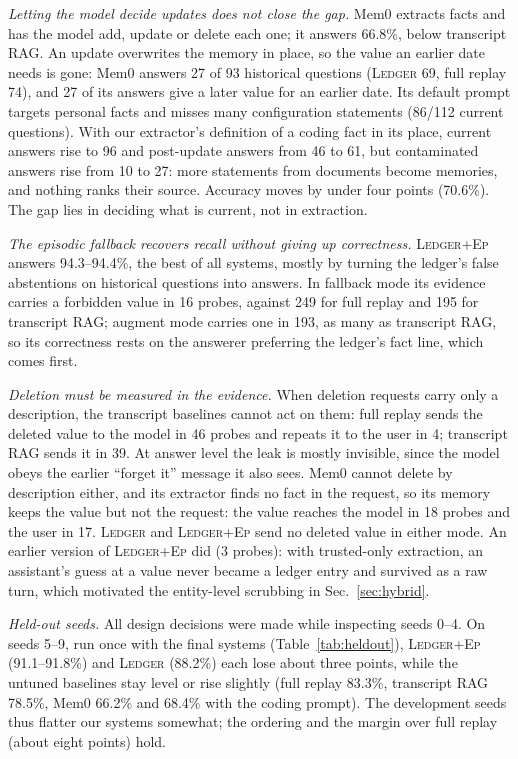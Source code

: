 \documentclass[10pt,conference]{IEEEtran}
\newcommand{\sys}{\textsc{Ledger}}
\newcommand{\hyb}{\textsc{Ledger+Ep}}
\begin{document}
\emph{Letting the model decide updates does not close the gap.} Mem0 extracts
facts and has the model add, update or delete each one; it answers 66.8\%,
below transcript RAG. An update overwrites the memory in place, so the value
an earlier date needs is gone: Mem0 answers 27 of 93 historical questions
(\sys{} 69, full replay 74), and 27 of its answers give a later value for an
earlier date. Its default prompt targets personal facts and misses many
configuration statements (86/112 current questions). With our extractor's
definition of a coding fact in its place, current answers rise to 96 and
post-update answers from 46 to 61, but contaminated answers rise from 10 to
27: more statements from documents become memories, and nothing ranks their
source. Accuracy moves by under four points (70.6\%). The gap lies in deciding
what is current, not in extraction.

\emph{The episodic fallback recovers recall without giving up correctness.}
\hyb{} answers 94.3--94.4\%, the best of all systems, mostly by turning the
ledger's false abstentions on historical questions into answers. In fallback
mode its evidence carries a forbidden value in 16 probes, against 249 for full
replay and 195 for transcript RAG; augment mode carries one in 193, as many as
transcript RAG, so its correctness rests on the answerer preferring the
ledger's fact line, which comes first.

\emph{Deletion must be measured in the evidence.} When deletion requests carry
only a description, the transcript baselines cannot act on them: full replay sends
the deleted value to the model in 46 probes and repeats it to the user in 4;
transcript RAG sends it in 39. At answer level the leak is mostly invisible, since
the model obeys the earlier ``forget it'' message it also sees. Mem0 cannot
delete by description either, and its extractor finds no fact in the request,
so its memory keeps the value but not the request: the value reaches the model
in 18 probes and the user in 17. \sys{} and \hyb{}
send no deleted value in either mode. An earlier version of \hyb{} did (3 probes):
with trusted-only extraction, an assistant's guess at a value never became a
ledger entry and survived as a raw turn, which motivated the entity-level
scrubbing in Sec.~\ref{sec:hybrid}.

\emph{Held-out seeds.} All design decisions were made while inspecting seeds
0--4. On seeds 5--9, run once with the final systems (Table~\ref{tab:heldout}),
\hyb{} (91.1--91.8\%) and \sys{} (88.2\%) each lose about three points,
while the untuned baselines stay level or rise slightly (full replay 83.3\%,
transcript RAG 78.5\%, Mem0 66.2\% and 68.4\% with the coding prompt). The development seeds thus flatter our systems
somewhat; the ordering and the margin over full replay (about eight points)
hold.
\end{document}

